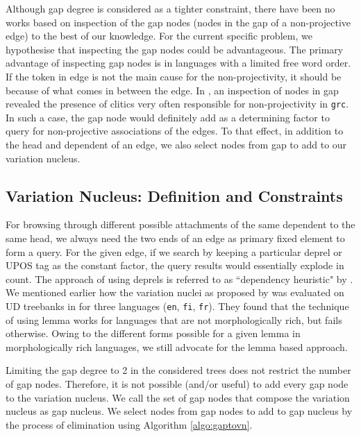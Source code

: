 Although gap degree is considered as a tighter constraint, there have been no works based on inspection of the gap nodes (nodes in the gap of a non-projective edge) to the best of our knowledge. For the current specific problem, we hypothesise that inspecting the gap nodes could be advantageous. The primary advantage of inspecting gap nodes is in languages with a limited free word order. If the token in edge is not the main cause for the non-projectivity, it should be because of what comes in between the edge. In \cite{mambriniNonProj}, an inspection of nodes in gap revealed the presence of clitics very often responsible for non-projectivity in \verb|grc|. In such a case, the gap node would definitely add as a determining factor to query for non-projective associations of the edges. To that effect, in addition to the head and dependent of an edge, we also select nodes from gap to add to our variation nucleus.

\subsection{Variation Nucleus: Definition and Constraints}
\label{ssec:variationdefn}

For browsing through different possible attachments of the same dependent to the same head, we always need the two ends of an edge as primary fixed element to form a query. For the given edge, if we search by keeping a particular deprel or UPOS tag as the constant factor, the query results would essentially explode in count. The approach of using deprels is referred to as ``dependency heuristic" by \citeauthor{boyd}. We mentioned earlier how the variation nuclei as proposed by \citeauthor{boyd} was evaluated on UD treebanks in \cite{de2017assessing} for three languages (\verb|en|, \verb|fi|, \verb|fr|). They found that the technique of using lemma works for languages that are not morphologically rich, but fails otherwise. Owing to the different forms possible for a given lemma in morphologically rich languages, we still advocate for the lemma based approach.

Limiting the gap degree to 2 in the considered trees does not restrict the number of gap nodes. Therefore, it is not possible (and/or useful) to add every gap node to the variation nucleus. We call the set of gap nodes that compose the variation nucleus as gap nucleus. We select nodes from gap nodes to add to gap nucleus by the process of elimination using Algorithm \ref{algo:gaptovn}.


